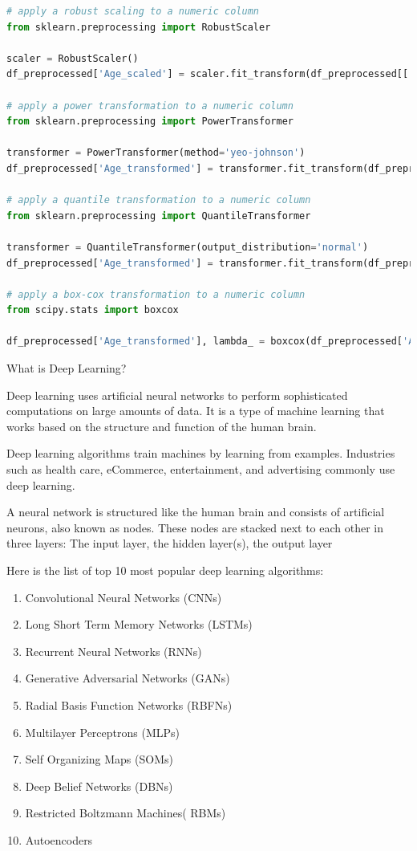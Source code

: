 \documentclass[11pt]{article}
\begin{document}
\begin{mdframed}[backgroundcolor=celadon!6]
\begin{lstlisting}[language=Python]
# apply a robust scaling to a numeric column
from sklearn.preprocessing import RobustScaler

scaler = RobustScaler()
df_preprocessed['Age_scaled'] = scaler.fit_transform(df_preprocessed[['Age']])

# apply a power transformation to a numeric column
from sklearn.preprocessing import PowerTransformer

transformer = PowerTransformer(method='yeo-johnson')
df_preprocessed['Age_transformed'] = transformer.fit_transform(df_preprocessed[['Age']])

# apply a quantile transformation to a numeric column
from sklearn.preprocessing import QuantileTransformer

transformer = QuantileTransformer(output_distribution='normal')
df_preprocessed['Age_transformed'] = transformer.fit_transform(df_preprocessed[['Age']])

# apply a box-cox transformation to a numeric column
from scipy.stats import boxcox

df_preprocessed['Age_transformed'], lambda_ = boxcox(df_preprocessed['Age'])
\end{lstlisting}
\end{mdframed}






What is Deep Learning?

Deep learning uses artificial neural networks to perform sophisticated computations on large amounts of data. It is a type of machine learning that works based on the structure and function of the human brain. 

Deep learning algorithms train machines by learning from examples. Industries such as health care, eCommerce, entertainment, and advertising commonly use deep learning.


A neural network is structured like the human brain and consists of artificial neurons, also known as nodes. These nodes are stacked next to each other in three layers:
The input layer, the hidden layer(s), the output layer



Here is the list of top 10 most popular deep learning algorithms:
\begin{enumerate}
\item Convolutional Neural Networks (CNNs)
\item Long Short Term Memory Networks (LSTMs)
\item Recurrent Neural Networks (RNNs)
\item Generative Adversarial Networks (GANs)
\item Radial Basis Function Networks (RBFNs)
\item Multilayer Perceptrons (MLPs)
\item Self Organizing Maps (SOMs)
\item Deep Belief Networks (DBNs)
\item Restricted Boltzmann Machines( RBMs)
\item Autoencoders
\end{enumerate} 
\end{document}
